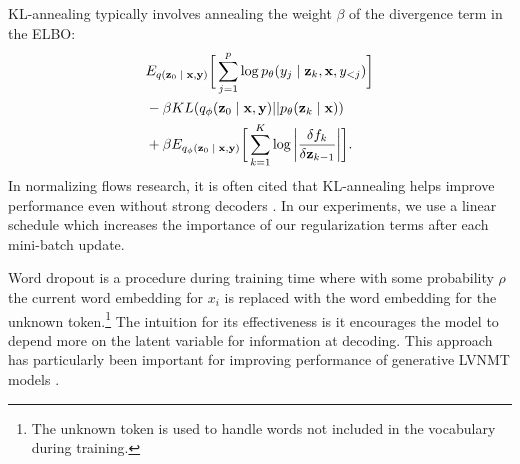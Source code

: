 KL-annealing typically involves annealing the weight $\beta$ of the divergence term in the \ac{ELBO}:
\begin{align}
\begin{split}\label{eq:2}
&
E_{q(\textbf{z}_{0}\; | \;{\textbf{x}, \textbf{y}})} \bigg[ \sum_{j=1}^{p} \log p_{\theta}(y_{j} \; | \;{\textbf{z}_{k}}, \textbf{x}, y_{<j}) \bigg] \\
& - \beta KL(q_{\phi}(\textbf{z}_{0} \; | \;{\textbf{x}, \textbf{y}}) || p_{\theta}(\textbf{z}_{k} \; | \;{\textbf{x}})) \\
&   +  \beta E_{q_{\phi}(\textbf{z}_{0} \; | \;{\textbf{x}, \textbf{y}})} \bigg[\sum_{k=1}^{K} \log \bigg|\frac{\delta f_{k}}{\delta \textbf{z}_{k-1}} \bigg| \bigg].  
\end{split}
\end{align}
In normalizing flows research, it is often cited that KL-annealing helps improve performance even without strong decoders \cite{rezende2015VIwithNF,kingma2016IAF,tomczak2016Householder,Berg2018SylvesterNF,ziegler2019LatentNFforDiscrete}. In our experiments, we use a linear schedule which increases the importance of our regularization terms after each mini-batch update. 


Word dropout is a procedure during training time where with some probability $\rho$ the current word embedding for $x_{i}$ is replaced with the word embedding for the unknown token.\footnote{The unknown token is used to handle words not included in the vocabulary during training.} The intuition for its effectiveness is it encourages the model to depend more on the latent variable for information at decoding. This approach has particularly been important for improving performance of generative \ac{LVNMT} models \cite{harshil2018GNMT,eikema2018AEVNMT}.

